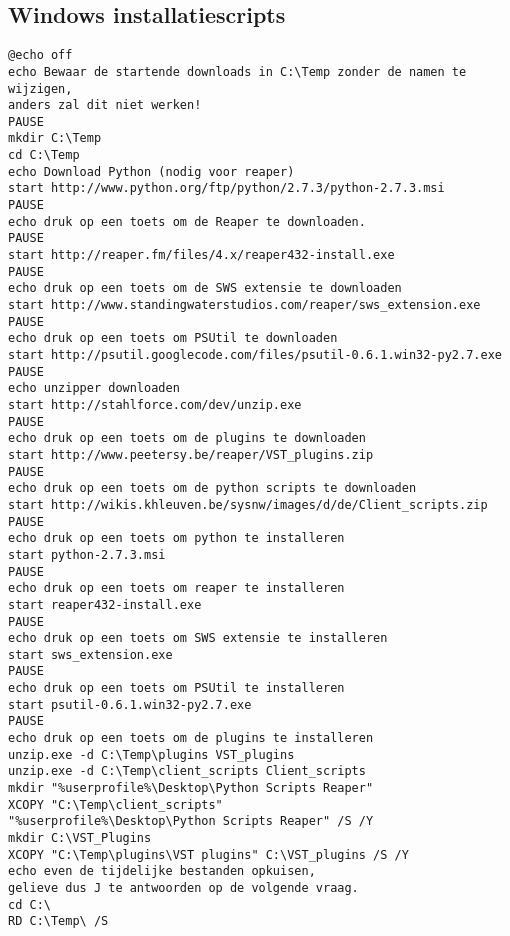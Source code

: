 \documentclass[DIV=calc]{scrartcl}
\begin{document}
\subsection{Windows installatiescripts}
\begin{lstlisting}[caption={reaper.bat}, label=Windows installatiescript 32bit]
@echo off
echo Bewaar de startende downloads in C:\Temp zonder de namen te wijzigen, 
anders zal dit niet werken!
PAUSE
mkdir C:\Temp
cd C:\Temp
echo Download Python (nodig voor reaper)
start http://www.python.org/ftp/python/2.7.3/python-2.7.3.msi
PAUSE
echo druk op een toets om de Reaper te downloaden.
PAUSE
start http://reaper.fm/files/4.x/reaper432-install.exe
PAUSE
echo druk op een toets om de SWS extensie te downloaden
start http://www.standingwaterstudios.com/reaper/sws_extension.exe
PAUSE
echo druk op een toets om PSUtil te downloaden
start http://psutil.googlecode.com/files/psutil-0.6.1.win32-py2.7.exe
PAUSE
echo unzipper downloaden
start http://stahlforce.com/dev/unzip.exe
PAUSE
echo druk op een toets om de plugins te downloaden
start http://www.peetersy.be/reaper/VST_plugins.zip
PAUSE
echo druk op een toets om de python scripts te downloaden
start http://wikis.khleuven.be/sysnw/images/d/de/Client_scripts.zip
PAUSE
echo druk op een toets om python te installeren
start python-2.7.3.msi
PAUSE
echo druk op een toets om reaper te installeren
start reaper432-install.exe
PAUSE
echo druk op een toets om SWS extensie te installeren
start sws_extension.exe
PAUSE
echo druk op een toets om PSUtil te installeren
start psutil-0.6.1.win32-py2.7.exe
PAUSE
echo druk op een toets om de plugins te installeren
unzip.exe -d C:\Temp\plugins VST_plugins
unzip.exe -d C:\Temp\client_scripts Client_scripts
mkdir "%userprofile%\Desktop\Python Scripts Reaper"
XCOPY "C:\Temp\client_scripts" 
"%userprofile%\Desktop\Python Scripts Reaper" /S /Y
mkdir C:\VST_Plugins
XCOPY "C:\Temp\plugins\VST plugins" C:\VST_plugins /S /Y
echo even de tijdelijke bestanden opkuisen, 
gelieve dus J te antwoorden op de volgende vraag.
cd C:\
RD C:\Temp\ /S
\end{lstlisting}
\end{document}
